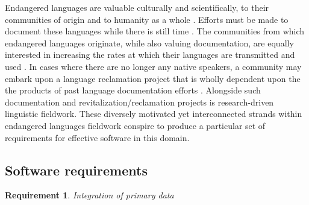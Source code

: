 \documentclass[11pt]{article}
\newtheorem{requirement}{Requirement}
\begin{document}
Endangered languages are valuable culturally and scientifically, to their
communities of origin \cite{Ironstrack:2012} and to humanity as a whole
\cite{harrison2007languages}. Efforts must be made to document these languages
while there is still time \cite{Good:2012,Thieberger:2012}. The communities from which endangered languages
originate, while also valuing documentation, are equally interested in
increasing the rates at which their languages are transmitted and used
\cite{Myaamia:2001}. In cases where there are no longer any native speakers, a
community may embark upon a language reclamation project that is wholly
dependent upon the the products of past language documentation efforts
\cite{Leonard:2012,Costa:2012}. Alongside such documentation and
revitalization/reclamation projects is research-driven linguistic fieldwork.
These diversely motivated yet interconnected strands within endangered
languages fieldwork conspire to produce a particular set of requirements for
effective software in this domain.




\subsection{Software requirements}
\label{sec:requirements}


\begin{requirement}
	\label{req:primary-data}
       Integration of primary data
\end{requirement}
\end{document}
